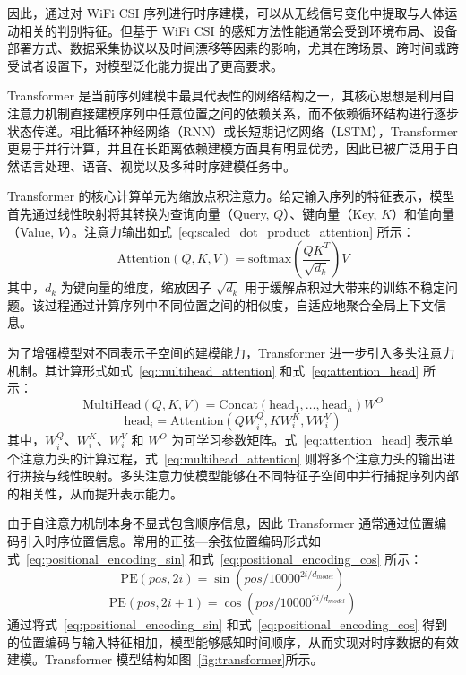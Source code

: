 因此，通过对 WiFi CSI 序列进行时序建模，可以从无线信号变化中提取与人体运动相关的判别特征。但基于 WiFi CSI 的感知方法性能通常会受到环境布局、设备部署方式、数据采集协议以及时间漂移等因素的影响，尤其在跨场景、跨时间或跨受试者设置下，对模型泛化能力提出了更高要求\cite{brunello2025time}。



Transformer 是当前序列建模中最具代表性的网络结构之一，其核心思想是利用自注意力机制直接建模序列中任意位置之间的依赖关系，而不依赖循环结构进行逐步状态传递\cite{vaswani2017attention}。相比循环神经网络（RNN）或长短期记忆网络（LSTM），Transformer 更易于并行计算，并且在长距离依赖建模方面具有明显优势，因此已被广泛用于自然语言处理、语音、视觉以及多种时序建模任务中。

Transformer 的核心计算单元为缩放点积注意力。给定输入序列的特征表示，模型首先通过线性映射将其转换为查询向量（Query, $Q$）、键向量（Key, $K$）和值向量（Value, $V$）。注意力输出如式~\eqref{eq:scaled_dot_product_attention} 所示：
\begin{equation}
\text{Attention}(Q, K, V) =
\text{softmax}\left(\frac{QK^T}{\sqrt{d_k}}\right)V
\label{eq:scaled_dot_product_attention}
\end{equation}
其中，$d_k$ 为键向量的维度，缩放因子 $\sqrt{d_k}$ 用于缓解点积过大带来的训练不稳定问题。该过程通过计算序列中不同位置之间的相似度，自适应地聚合全局上下文信息。

为了增强模型对不同表示子空间的建模能力，Transformer 进一步引入多头注意力机制。其计算形式如式~\eqref{eq:multihead_attention} 和式~\eqref{eq:attention_head} 所示：
\begin{equation}
\text{MultiHead}(Q, K, V) =
\text{Concat}(\text{head}_1, \ldots, \text{head}_h)W^O
\label{eq:multihead_attention}
\end{equation}
\begin{equation}
\text{head}_i =
\text{Attention}(QW_i^Q, KW_i^K, VW_i^V)
\label{eq:attention_head}
\end{equation}
其中，$W_i^Q$、$W_i^K$、$W_i^V$ 和 $W^O$ 为可学习参数矩阵。式~\eqref{eq:attention_head} 表示单个注意力头的计算过程，式~\eqref{eq:multihead_attention} 则将多个注意力头的输出进行拼接与线性映射。多头注意力使模型能够在不同特征子空间中并行捕捉序列内部的相关性，从而提升表示能力。

由于自注意力机制本身不显式包含顺序信息，因此 Transformer 通常通过位置编码引入时序位置信息。常用的正弦—余弦位置编码形式如式~\eqref{eq:positional_encoding_sin} 和式~\eqref{eq:positional_encoding_cos} 所示：
\begin{equation}
\mathrm{PE}(pos, 2i) =
\sin\left(pos / 10000^{2i/d_{model}}\right)
\label{eq:positional_encoding_sin}
\end{equation}
\begin{equation}
\mathrm{PE}(pos, 2i+1) =
\cos\left(pos / 10000^{2i/d_{model}}\right)
\label{eq:positional_encoding_cos}
\end{equation}
通过将式~\eqref{eq:positional_encoding_sin} 和式~\eqref{eq:positional_encoding_cos} 得到的位置编码与输入特征相加，模型能够感知时间顺序，从而实现对时序数据的有效建模。Transformer 模型结构如图~\ref{fig:transformer}所示。

